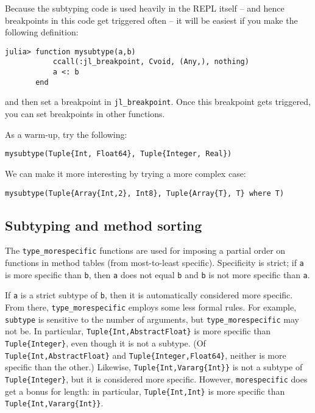 Because the subtyping code is used heavily in the REPL itself – and hence breakpoints in this code get triggered often – it will be easiest if you make the following definition:




\begin{verbatim}
julia> function mysubtype(a,b)
           ccall(:jl_breakpoint, Cvoid, (Any,), nothing)
           a <: b
       end
\end{verbatim}



and then set a breakpoint in \texttt{jl\_breakpoint}.  Once this breakpoint gets triggered, you can set breakpoints in other functions.



As a warm-up, try the following:




\begin{verbatim}
mysubtype(Tuple{Int, Float64}, Tuple{Integer, Real})
\end{verbatim}



We can make it more interesting by trying a more complex case:




\begin{verbatim}
mysubtype(Tuple{Array{Int,2}, Int8}, Tuple{Array{T}, T} where T)
\end{verbatim}



\hypertarget{9271541181781970079}{}


\subsection{Subtyping and method sorting}



The \texttt{type\_morespecific} functions are used for imposing a partial order on functions in method tables (from most-to-least specific). Specificity is strict; if \texttt{a} is more specific than \texttt{b}, then \texttt{a} does not equal \texttt{b} and \texttt{b} is not more specific than \texttt{a}.



If \texttt{a} is a strict subtype of \texttt{b}, then it is automatically considered more specific. From there, \texttt{type\_morespecific} employs some less formal rules. For example, \texttt{subtype} is sensitive to the number of arguments, but \texttt{type\_morespecific} may not be. In particular, \texttt{Tuple\{Int,AbstractFloat\}} is more specific than \texttt{Tuple\{Integer\}}, even though it is not a subtype.  (Of \texttt{Tuple\{Int,AbstractFloat\}} and \texttt{Tuple\{Integer,Float64\}}, neither is more specific than the other.)  Likewise, \texttt{Tuple\{Int,Vararg\{Int\}\}} is not a subtype of \texttt{Tuple\{Integer\}}, but it is considered more specific. However, \texttt{morespecific} does get a bonus for length: in particular, \texttt{Tuple\{Int,Int\}} is more specific than \texttt{Tuple\{Int,Vararg\{Int\}\}}.




